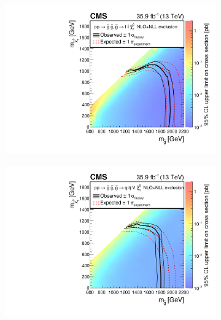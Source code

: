\begin{figure}
\centering
\begin{subfigure}{0.4\textwidth}
\centering
\includegraphics[width=\textwidth]{figs/CMS-SUS-16-033_Figure_012-a.pdf}  
\end{subfigure}
\begin{subfigure}{0.4\textwidth}
\centering
\includegraphics[width=\textwidth]{figs/CMS-SUS-16-033_Figure_012-d.pdf}
\end{subfigure}

\end{figure}
